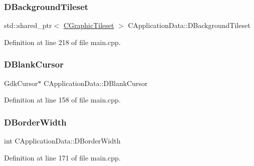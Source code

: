 \subsubsection{\texorpdfstring{D\+Background\+Tileset}{DBackgroundTileset}}
{\footnotesize\ttfamily std\+::shared\+\_\+ptr$<$ \hyperlink{classCGraphicTileset}{C\+Graphic\+Tileset} $>$ C\+Application\+Data\+::\+D\+Background\+Tileset\hspace{0.3cm}{\ttfamily [protected]}}



Definition at line 218 of file main.\+cpp.

\hypertarget{classCApplicationData_a34b9a8bb2c85704fb4bd07209acdcdc4}{}\label{classCApplicationData_a34b9a8bb2c85704fb4bd07209acdcdc4} 
\subsubsection{\texorpdfstring{D\+Blank\+Cursor}{DBlankCursor}}
{\footnotesize\ttfamily Gdk\+Cursor$\ast$ C\+Application\+Data\+::\+D\+Blank\+Cursor\hspace{0.3cm}{\ttfamily [protected]}}



Definition at line 158 of file main.\+cpp.

\hypertarget{classCApplicationData_a566b69c72fa982c6ecf8e47dc21df489}{}\label{classCApplicationData_a566b69c72fa982c6ecf8e47dc21df489} 
\subsubsection{\texorpdfstring{D\+Border\+Width}{DBorderWidth}}
{\footnotesize\ttfamily int C\+Application\+Data\+::\+D\+Border\+Width\hspace{0.3cm}{\ttfamily [protected]}}



Definition at line 171 of file main.\+cpp.

\hypertarget{classCApplicationData_accd0e5b0bf28b34b8cce8148eb13de31}{}\label{classCApplicationData_accd0e5b0bf28b34b8cce8148eb13de31} 
